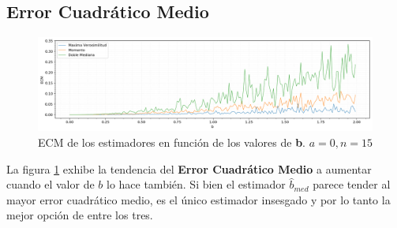 \subsection{Error Cuadrático Medio}
\begin{figure}[H]
	\centering
	\includegraphics[width=1\textwidth]{imagenes/ecm.png}
	\caption{\footnotesize ECM de los estimadores en función de los valores de \textbf{b}. $a=0, n=15$}
	\label{fig:ej6-ecm}
\end{figure}

La figura \ref{fig:ej6-ecm} exhibe la tendencia del \textbf{Error Cuadrático Medio} a aumentar cuando el valor de $b$ lo hace también. Si bien el estimador $\hat{b}_{med}$ parece tender al mayor error cuadrático medio, es el único estimador insesgado y por lo tanto la mejor opción de entre los tres.